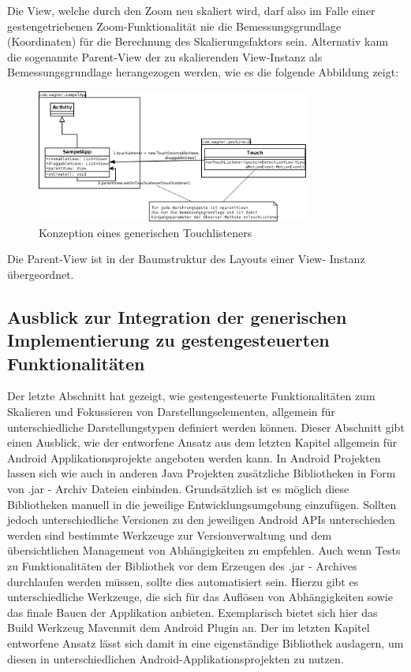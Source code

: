 \documentclass[12pt,oneside,a4paper,bibtotoc,liststotoc]{scrreprt}
\begin{document}
 \newline
Die View, welche durch den Zoom neu skaliert wird, darf also im Falle einer gestengetriebenen Zoom-Funktionalität nie die Bemessungsgrundlage (Koordinaten) für die Berechnung des Skalierungsfaktors sein. Alternativ kann die sogenannte Parent-View der zu skalierenden View-Instanz als Bemessungsgrundlage herangezogen werden, wie es die folgende Abbildung zeigt: \newline
\begin{figure}[H]
  \begin{centering}
    \includegraphics[width=0.8\textwidth]{img/touchFragments.png}
    \caption{Konzeption eines generischen Touchlisteners}
    \label{callingTouchListener}
  \end{centering}
\end{figure} Die Parent-View ist in der Baumstruktur des Layouts einer View- Instanz übergeordnet. 

\subsection{Ausblick zur Integration der generischen Implementierung zu gestengesteuerten Funktionalitäten}
Der letzte Abschnitt hat gezeigt, wie gestengesteuerte Funktionalitäten zum Skalieren und Fokussieren von Darstellungselementen, allgemein für unterschiedliche Darstellungstypen definiert werden können. Dieser Abschnitt gibt einen Ausblick, wie der entworfene Ansatz aus dem letzten Kapitel allgemein für Android Applikationsprojekte angeboten werden kann.\newline
In Android Projekten lassen sich wie auch in anderen Java Projekten zusätzliche Bibliotheken in Form von .jar - Archiv Dateien einbinden. Grundsätzlich ist es möglich diese Bibliotheken manuell in die jeweilige Entwicklungsumgebung einzufügen. Sollten jedoch unterschiedliche Versionen zu den jeweiligen Android APIs unterschieden werden sind bestimmte Werkzeuge zur Versionverwaltung und dem übersichtlichen Management von Abhängigkeiten zu empfehlen. Auch wenn Tests zu Funktionalitäten der Bibliothek vor dem Erzeugen des .jar - Archives durchlaufen werden müssen, sollte dies automatisiert sein. Hierzu gibt es unterschiedliche Werkzeuge, die sich für das Auflösen von Abhängigkeiten sowie das finale Bauen der Applikation anbieten. Exemplarisch bietet sich hier das Build Werkzeug \glqq Maven\grqq mit dem Android Plugin an. Der im letzten Kapitel entworfene Ansatz lässt sich damit in eine eigenständige Bibliothek auslagern, um diesen in unterschiedlichen Android-Applikationsprojekten zu nutzen.
\end{document}
